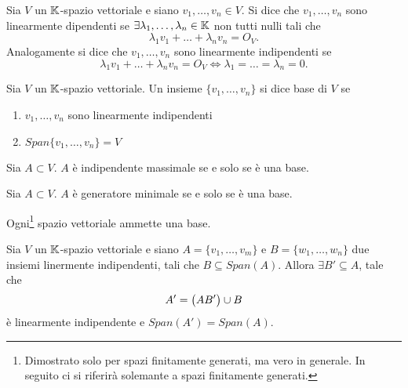 \begin{definition} 
	Sia $ V $ un $ \mathbb{K} $-spazio vettoriale e siano $ v_1, \ldots , v_n \in V $. Si dice che $ v_1, \ldots, v_n $ 
	sono linearmente dipendenti se $ \exists \lambda_1, \ldots , \lambda_n \in \mathbb{K} $ non tutti nulli tali che 
	\[\lambda_1 v_1 + \ldots + \lambda_n v_n = O_V.\] Analogamente si dice che $ v_1, \ldots, v_n $ sono linearmente 
	indipendenti se \[\lambda_1 v_1 + \ldots + \lambda_n v_n = O_V \iff \lambda_1 = \ldots = \lambda_n = 0.\]	
\end{definition}

\begin{definition}[Base]
	Sia $ V $ un $ \mathbb{K} $-spazio vettoriale. Un insieme $ \{v_1, \ldots, v_n\} $ si dice base di $ V $ se
	\begin{enumerate}[label=(\roman*)]
		\item $ v_1, \ldots, v_n $ sono linearmente indipendenti
		\item $ Span\{v_1, \ldots , v_n\} = V $
	\end{enumerate}
\end{definition}


\begin{lemma}
	Sia $A \subset V$. $A$ è indipendente massimale se e solo se è una base. 
\end{lemma}

\begin{lemma}
        Sia $A \subset V$. $A$ è generatore minimale se e solo se è una base.
\end{lemma}

\begin{thm}
	Ogni\footnote{Dimostrato solo per spazi finitamente generati, ma vero in generale. In seguito ci si riferirà solemante a spazi finitamente generati.} 
	spazio vettoriale ammette una base.
\end{thm}

\begin{lemma}
	Sia $ V $ un $ \mathbb{K} $-spazio vettoriale e siano $ A = \{v_1, \ldots, v_m\} $ e $ B = \{  w_1, \ldots, w_n \} $ due insiemi linermente indipendenti,
	tali che $ B \subseteq Span(A) $. Allora $\exists B' \subseteq A $, tale che
	\[ A' = \left ( A \\ B' \right ) \cup B \] è linearmente indipendente e $Span(A') = Span(A)$. 
\end{lemma}

